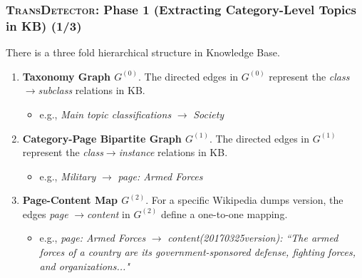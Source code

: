 \documentclass{beamer}
\begin{document}
\begin{frame}
\frametitle{\textsc{TransDetector}: Phase 1 (Extracting Category-Level Topics in KB) (1/3)}	
There is a three fold hierarchical structure in Knowledge Base.
\begin{enumerate}
	\item \textbf{Taxonomy Graph \(G^{(0)}\)}. The directed edges in \(G^{(0)}\) represent the \textit{class}\(\rightarrow\)\textit{subclass} relations in KB. 
		\begin{itemize}
			\item e.g., \textit{Main topic classifications} \(\rightarrow\) \textit{Society}
		\end{itemize}
	\item \textbf{Category-Page Bipartite Graph \(G^{(1)}\)}. The directed edges in \(G^{(1)}\) represent the \textit{class}\(\rightarrow\)\textit{instance} relations in KB.
		\begin{itemize}
			\item e.g., \textit{Military} \(\rightarrow\) \textit{page: Armed Forces}
		\end{itemize}
	\item \textbf{Page-Content Map \(G^{(2)}\)}. 
For a specific Wikipedia dumps version, the edges  \textit{page} \(\rightarrow\)\textit{content} in \(G^{(2)}\) define a one-to-one mapping.
		\begin{itemize}
			\item e.g., \textit{page: Armed Forces} \(\rightarrow\) \textit{content(20170325version): ``The armed forces of a country are its government-sponsored defense, fighting forces, and organizations..."}
		\end{itemize}
\end{enumerate}
\end{frame}
\end{document}
